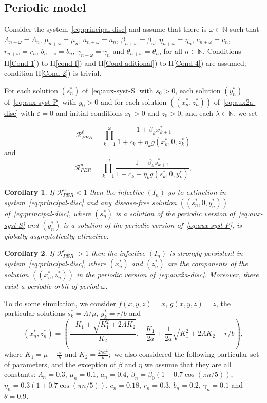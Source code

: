 \documentclass[reqno]{amsart}
\newtheorem{corollary}{Corollary}
\newcommand{\eps}{\varepsilon}
\newcommand{\cR}{\mathcal R}
\newcommand{\N}{\ensuremath{\mathds N}}
\begin{document}
{{%
\subsection{Periodic model}
Consider the system~\eqref{eq:principal-disc} and assume that there is $\omega \in \N$ such that $\Lambda_{n+\omega}=\Lambda_n$, $\mu_{n+\omega}=\mu_n$, $a_{n+\omega}=a_n$, $\beta_{n+\omega}=\beta_n$, $\eta_{n+\omega}=\eta_n$, $c_{n+\omega}=c_n$, $r_{n+\omega}=r_n$, $b_{n+\omega}=b_n$, $\gamma_{n+\omega}=\gamma_n$ and $\theta_{n+\omega}=\theta_n$, for all $n \in \N$. Conditions H\ref{Cond-1}) to H\ref{cond-f}) and  H\ref{Cond-aditional}) to  H\ref{Cond-4}) are assumed; condition H\ref{Cond-2}) is trivial.

For each solution $(s_n^*)$ of~\eqref{eq:aux-syst-S} with $s_0>0$, each solution $(y_n^*)$ of~\eqref{eq:aux-syst-P} with $y_0>0$ and for each solution $((x^*_n,z^*_n))$ of~\eqref{eq:aux2a-disc} with $\eps=0$ and initial conditions $x_0>0$ and $z_0>0$, and each $\lambda \in \N$, we set

\[
\mathcal R_{PER}^\ell=\prod_{k=1}^{\omega}\frac{1+\beta_k x^*_{k+1}}{1+c_k+\eta_k g(x^*_k,0,z^*_k)}
\]
and
\[
\mathcal R_{PER}^u=\prod_{k=1}^{\omega}\frac{1+\beta_k s^*_{k+1}}{1+c_k+\eta_kg(s^*_k,0,y^*_k)},
\]

\begin{corollary}
If $\cR_{PER}^u<1$ then the infective $(I_n)$ go to extinction in system~\eqref{eq:principal-disc} and any disease-free solution $((s^*_n,0,y^*_n))$ of~\eqref{eq:principal-disc}, where $(s^*_n)$ is a solution of the periodic version of~\eqref{eq:aux-syst-S} and $(y^*_n)$ is a solution of the periodic version of~\eqref{eq:aux-syst-P}, is globally asymptotically attractive.
\end{corollary}

\begin{corollary}
If $\cR_{PER}^\ell~>1$ then the infective $(I_n)$ is strongly persistent in system~\eqref{eq:principal-disc}, where $(x^*_n)$ and $(z^*_n)$ are the components of the solution $((x^*_n, z^*_n))$ in the periodic version of~\eqref{eq:aux2a-disc}. Moreover, there exist a periodic orbit of period $\omega.$
\end{corollary}


To do some simulation, we consider $f(x,y,z)=x$, $g(x,y,z)=z$, the particular solutions $s^*_k=\Lambda/\mu$, $y^*_k=r/b$ and $$(x^*_n,z^*_n)=\left(\frac{-K_1+\sqrt{K_1^2+2\Lambda K_2}}{K_2},-\frac{K_1}{2a}+\frac{1}{2a}\sqrt{K_1^2+2\Lambda K_2}+r/b\right),$$
where $K_1=\mu+\frac{ar}{b}$ and $K_2=\frac{2\gamma a^2}{b};$  we also considered the following particular set of parameters, and the exception of $\beta$ and $\eta$ we assume that they are all constants: $\Lambda_n=0.3$, $\mu_n=0.1$, $a_n=0.4$, $\beta_n=\beta_0(1+0.7\cos(\pi n/5))$, $\eta_n=0.3(1+0.7\cos(\pi n/5))$, $c_n=0.18$, $r_n=0.3$, $b_n=0.2$, $\gamma_n=0.1$ and $\theta=0.9$.

}}
\end{document}

